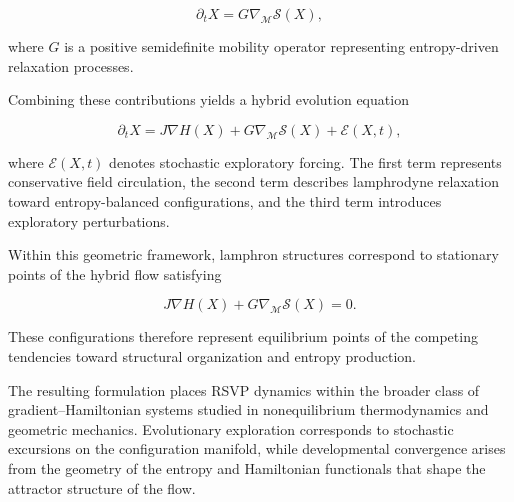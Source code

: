 \documentclass[12pt]{article}
\begin{document}
\begin{equation}
\partial_t X = G \nabla_{\mathcal{M}} \mathcal{S}(X),
\end{equation}

where $G$ is a positive semidefinite mobility operator representing entropy-driven relaxation processes.

Combining these contributions yields a hybrid evolution equation

\begin{equation}
\partial_t X =
J \nabla H(X)
+
G \nabla_{\mathcal{M}} \mathcal{S}(X)
+
\mathcal{E}(X,t),
\end{equation}

where $\mathcal{E}(X,t)$ denotes stochastic exploratory forcing.  
The first term represents conservative field circulation, the second term describes lamphrodyne relaxation toward entropy-balanced configurations, and the third term introduces exploratory perturbations.

Within this geometric framework, lamphron structures correspond to stationary points of the hybrid flow satisfying

\begin{equation}
J \nabla H(X)
+
G \nabla_{\mathcal{M}} \mathcal{S}(X)
= 0 .
\end{equation}

These configurations therefore represent equilibrium points of the competing tendencies toward structural organization and entropy production.

The resulting formulation places RSVP dynamics within the broader class of gradient–Hamiltonian systems studied in nonequilibrium thermodynamics and geometric mechanics.  Evolutionary exploration corresponds to stochastic excursions on the configuration manifold, while developmental convergence arises from the geometry of the entropy and Hamiltonian functionals that shape the attractor structure of the flow.
\end{document}
